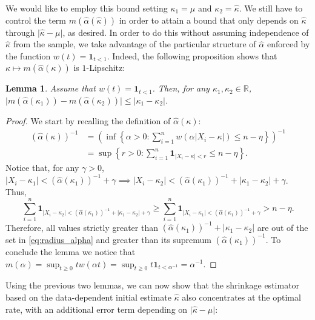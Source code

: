 \documentclass{article}
\theoremstyle{plain}
\newtheorem{lemma}[theorem]{Lemma}
\theoremstyle{definition}
\def\R{\mathbb{R}} %
\begin{document}
\begin{appendix}
We would like to employ this bound setting \( \kappa_1=\mu  \) and \( \kappa_2=\widehat{\kappa }  \). We still have to control the term \( m(\widehat{\alpha }(\widehat{\kappa } ))  \) in order to attain a bound that only depends on \( \widehat{\kappa }  \) through \( \lvert \widehat{\kappa } -\mu  \rvert  \), as desired. In order to do this without assuming independence of \( \widehat{\kappa }  \) from the sample, we take advantage of the particular structure of \( \widehat{\alpha }  \) enforced by the function \( w(t)=\mathbf{1}_{t<1} \). Indeed, the following proposition shows that \( \kappa \mapsto m(\widehat{\alpha }(\kappa ) ) \) is \( 1 \)-Lipschitz:  
\begin{lemma}
  Assume that \( w(t)=\mathbf{1}_{t<1} \). Then, for any \( \kappa_1, \kappa_2 \in \R  \), \( \lvert m(\widehat{\alpha }(\kappa _1) ) - m(\widehat{\alpha }(\kappa _2) )  \rvert  \le \lvert \kappa _1 -\kappa _2 \rvert  \).   
\end{lemma}
\begin{proof}
We start by recalling the definition of \( \widehat{\alpha }(\kappa )  \):
\begin{align}
  (\widehat{\alpha }(\kappa  ))^{-1} &= \left(\inf \left\{\alpha > 0: \sum_{i=1}^n w(\alpha \lvert X_i -\kappa  \rvert  ) \le n - \eta  \right\}\right)^{-1}\nonumber\\
                                     &=\sup \left\{r > 0: \sum_{i=1}^n \mathbf{1}_{\lvert X_i -\kappa  \rvert < r } \le n - \eta  \right\}.\label{eq:radius_alpha}
\end{align} 
Notice that, for any \( \gamma >0 \),  \( \lvert X_i - \kappa _1 \rvert < (\widehat{\alpha }(\kappa_1) )^{-1} + \gamma \implies \lvert X_i -\kappa _2 \rvert < (\widehat{\alpha }(\kappa_1) )^{-1} + \lvert \kappa _1 - \kappa _2 \rvert +\gamma   \). Thus, \[
  \sum_{i=1}^n \mathbf{1}_{\lvert X_i -\kappa _2 \rvert < (\widehat{\alpha }(\kappa_1) )^{-1} + \lvert \kappa _1 -\kappa _2 \rvert +\gamma  } \ge \sum_{i=1}^n \mathbf{1}_{\lvert X_i -\kappa _1 \rvert < (\widehat{\alpha }(\kappa_1) )^{-1} + \gamma } > n - \eta.
\]  
Therefore, all values strictly greater than \( (\widehat{\alpha }(\kappa_1 ))^{-1}+\lvert \kappa_1 - \kappa _2 \rvert   \) are out of the set in \eqref{eq:radius_alpha} and greater than its supremum \( (\widehat{\alpha }(\kappa _1))^{-1}  \). To conclude the lemma we notice that \( m(\alpha)=\sup_{t\ge 0}tw(\alpha t)=\sup_{t\ge 0}t\mathbf{1}_{t<\alpha^{-1} }=\alpha^{-1} \). 
\end{proof}
Using the previous two lemmas, we can now show that the shrinkage estimator based on the data-dependent initial estimate \( \widehat{\kappa }  \) also concentrates at the optimal rate, with an additional error term depending on \( \lvert \widehat{\kappa } -\mu  \rvert  \):

\end{appendix}
\end{document}
